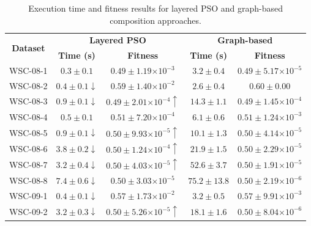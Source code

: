 \documentclass{llncs}
\providecommand{\e}[1]{\ensuremath{\times 10^{#1}}}
\begin{document}
\begin{table}[h]
\centering
\caption{Execution time and fitness results for layered PSO and graph-based composition approaches.}
\label{tab:results_layered}
\begin{tabular}{|c|c|c|c|c|}
\hline
\multirow{2}{*}{{\bf Dataset}} & \multicolumn{2}{c|}{{\bf Layered PSO}}             & \multicolumn{2}{c|}{{\bf Graph-based}}                     \\ \cline{2-5} 
                               & {\bf Time (s)}    & {\bf Fitness}                  & {\bf Time (s)}            & {\bf Fitness}                  \\ \hline
WSC-08-1                       & $0.3 \pm 0.1$            & $0.49 \pm 1.19\e{-3}$          & $3.2 \pm 0.4$             & $0.49 \pm 5.17\e{-5}$          \\ \hline
WSC-08-2                       & $0.4 \pm 0.1 \downarrow$ & $0.59 \pm 1.40\e{-2}$          & $2.6 \pm 0.4$             & $0.60 \pm 0.00$                \\ \hline
WSC-08-3                       & $0.9 \pm 0.1 \downarrow$ & $0.49 \pm 2.01\e{-4} \uparrow$ & $14.3 \pm 1.1$            & $0.49 \pm 1.45\e{-4}$          \\ \hline
WSC-08-4                       & $0.5 \pm 0.1$            & $0.51 \pm 7.20\e{-4}$          & $6.1 \pm 0.6$             & $0.51 \pm 1.24\e{-3}$          \\ \hline
WSC-08-5                       & $0.9 \pm 0.1 \downarrow$ & $0.50 \pm 9.93\e{-5} \uparrow$ & $10.1 \pm 1.3$            & $0.50 \pm 4.14\e{-5}$          \\ \hline
WSC-08-6                       & $3.8 \pm 0.2 \downarrow$ & $0.50 \pm 1.24\e{-4} \uparrow$ & $21.9 \pm 1.5$            & $0.50 \pm 2.29\e{-5}$          \\ \hline
WSC-08-7                       & $3.2 \pm 0.4 \downarrow$ & $0.50 \pm 4.03\e{-5} \uparrow$ & $52.6 \pm 3.7$            & $0.50 \pm 1.91\e{-5}$          \\ \hline
WSC-08-8                       & $7.4 \pm 0.6 \downarrow$ & $0.50 \pm 3.03\e{-5}$          & $75.2 \pm 13.8$           & $0.50 \pm 2.19\e{-6}$          \\ \hline
WSC-09-1                       & $0.4 \pm 0.1 \downarrow$ & $0.57 \pm 1.73\e{-2}$          & $3.2 \pm 0.5$             & $0.57 \pm 9.91\e{-3}$          \\ \hline
WSC-09-2                       & $3.2 \pm 0.3 \downarrow$ & $0.50 \pm 5.26\e{-5} \uparrow$ & $18.1 \pm 1.6$            & $0.50 \pm 8.04\e{-6}$          \\ \hline

\end{tabular}
\end{table}
\end{document}
